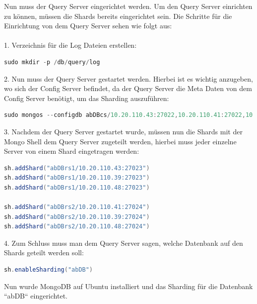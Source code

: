 Nun muss der Query Server eingerichtet werden. Um den Query Server einrichten zu k\"onnen, m\"ussen die Shards bereits eingerichtet sein. Die Schritte f\"ur die Einrichtung von dem Query Server sehen wie folgt aus:
\\
\\
1.	Verzeichnis f\"ur die Log Dateien erstellen:
\begin{lstlisting}[caption={Verzeichnis f\"ur den Query Server erstellen}, language=java,captionpos=t,numbers=none, numberstyle=\tiny,basicstyle=\scriptsize,breaklines=true]
sudo mkdir -p /db/query/log 
\end{lstlisting}
2.	Nun muss der Query Server gestartet werden. Hierbei ist es wichtig anzugeben, wo sich der Config Server befindet, da der Query Server die Meta Daten von dem Config Server ben\"otigt, um das Sharding auszuf\"uhren:
\begin{lstlisting}[caption={Query Server starten}, language=java,captionpos=t,numbers=none, numberstyle=\tiny,basicstyle=\scriptsize,breaklines=true]
sudo mongos --configdb abDBcs/10.20.110.43:27022,10.20.110.41:27022,10.20.110.39:27022 --port 27021 --fork --logpath /db/query/log/mongodb.log 
\end{lstlisting}
3.	Nachdem der Query Server gestartet wurde, m\"ussen nun die Shards mit der Mongo Shell dem Query Server zugeteilt werden, hierbei muss jeder einzelne Server von einem Shard eingetragen werden:
\begin{lstlisting}[caption={Befehl, um die Shards dem Query Server zuzuweisen}, language=java,captionpos=t,numbers=none, numberstyle=\tiny,basicstyle=\scriptsize,breaklines=true]
sh.addShard("abDBrs1/10.20.110.43:27023") 
sh.addShard("abDBrs1/10.20.110.39:27023") 
sh.addShard("abDBrs1/10.20.110.48:27023") 

sh.addShard("abDBrs2/10.20.110.41:27024")
sh.addShard("abDBrs2/10.20.110.39:27024") 
sh.addShard("abDBrs2/10.20.110.48:27024") 
\end{lstlisting} 
4.	Zum Schluss muss man dem Query Server sagen, welche Datenbank auf den Shards geteilt werden soll:
\begin{lstlisting}[caption={Sharding f\"ur die Datenbank aktivieren}, language=java,captionpos=t,numbers=none, numberstyle=\tiny,basicstyle=\scriptsize,breaklines=true]
sh.enableSharding("abDB") 
\end{lstlisting}
Nun wurde MongoDB auf Ubuntu installiert und das Sharding f\"ur die Datenbank ``abDB`` eingerichtet.\cite{mongo01}
